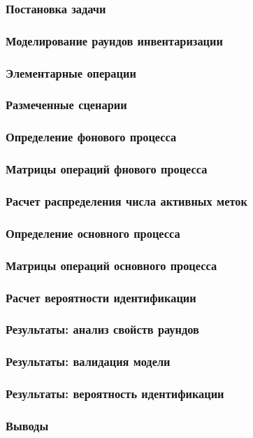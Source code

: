 \begin{frame}
    \frametitle{Постановка задачи}
\end{frame}

\begin{frame}
    \frametitle{Моделирование раундов инвентаризации}
\end{frame}

\begin{frame}
    \frametitle{Элементарные операции}
\end{frame}

\begin{frame}
    \frametitle{Размеченные сценарии}
\end{frame}

\begin{frame}
    \frametitle{Определение фонового процесса}
\end{frame}

\begin{frame}
    \frametitle{Матрицы операций фнового процесса}
\end{frame}

\begin{frame}
    \frametitle{Расчет распределения числа активных меток}
\end{frame}

\begin{frame}
    \frametitle{Определение основного процесса}
\end{frame}

\begin{frame}
    \frametitle{Матрицы операций основного процесса}
\end{frame}

\begin{frame}
    \frametitle{Расчет вероятности идентификации}
\end{frame}

\begin{frame}
    \frametitle{Результаты: анализ свойств раундов}
\end{frame}

\begin{frame}
    \frametitle{Результаты: валидация модели}
\end{frame}

\begin{frame}
    \frametitle{Результаты: вероятность идентификации}
\end{frame}

\begin{frame}
    \frametitle{Выводы}
\end{frame}





